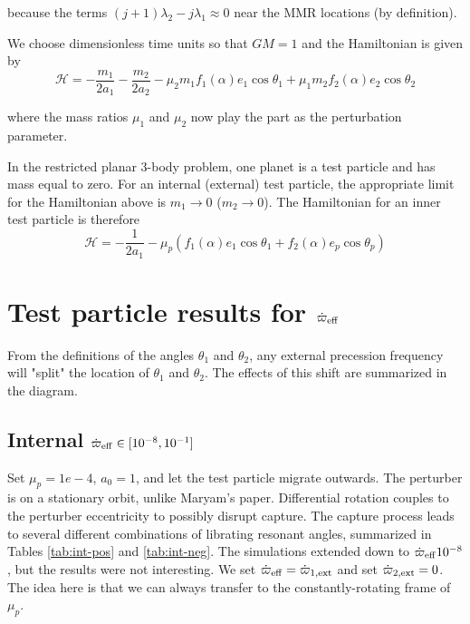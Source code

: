 \documentclass[11pt]{article}
\begin{document}
\noindent
because the terms \((j+1)\lambda_2-j\lambda_1\approx 0\) near the MMR locations (by definition).

We choose dimensionless time units so that \(GM=1\) and
the Hamiltonian is given by
\begin{equation}
  \mathcal{H} = -\frac{m_1}{2a_1} -\frac{m_2}{2a_2} - \mu_2 m_1 f_1(\alpha) e_1 \cos\theta_1 + \mu_1 m_2 f_2(\alpha) e_2\cos\theta_2
\end{equation}

\noindent
where the mass ratios \(\mu_1\) and \(\mu_2\) now play the part as the perturbation parameter.

In the restricted planar 3-body problem, one planet is a test particle and has mass equal to zero.
For an internal (external) test particle,
the appropriate limit for the Hamiltonian above is \(m_1\to0\) (\(m_2\to0\)).
The Hamiltonian for an inner test particle is therefore
\begin{equation}
  \mathcal{H} = -\frac{1}{2a_1} - \mu_p( f_1(\alpha) e_1 \cos\theta_1 + f_2(\alpha) e_p\cos\theta_p)
\end{equation}

\noindent

\section{Test particle results for \(\dot\varpi_{\rm eff}\)}
\label{sec:orgd8d7b99}
From the definitions of the angles \(\theta_1\) and \(\theta_2\),
any external precession frequency will "split" the location
of \(\theta_1\) and \(\theta_2\). The effects of this
shift are summarized in the diagram.
\subsection{Internal \(\dot\varpi_{\rm eff}\in[10^{-8},10^{-1}]\)}
\label{sec:org60feef6}
Set \(\mu_p=1e-4\), \(a_0=1\), and let the test particle migrate
outwards. The perturber is on a stationary orbit, unlike Maryam's
paper. Differential rotation couples to the perturber eccentricity to
possibly disrupt capture.  The capture process leads to several
different combinations of librating resonant angles, summarized in
Tables \ref{tab:int-pos} and \ref{tab:int-neg}.  The simulations extended
down to \(\dot\varpi_{\rm eff}10^{-8}\), but the results were not
interesting.  We set \(\dot\varpi_{\rm eff} = \dot\varpi_{1,\rm ext}\)
and set \(\dot\varpi_{2, \rm ext}=0\). The idea here is
that we can always transfer to the constantly-rotating
frame of \(\mu_p\).
\end{document}
